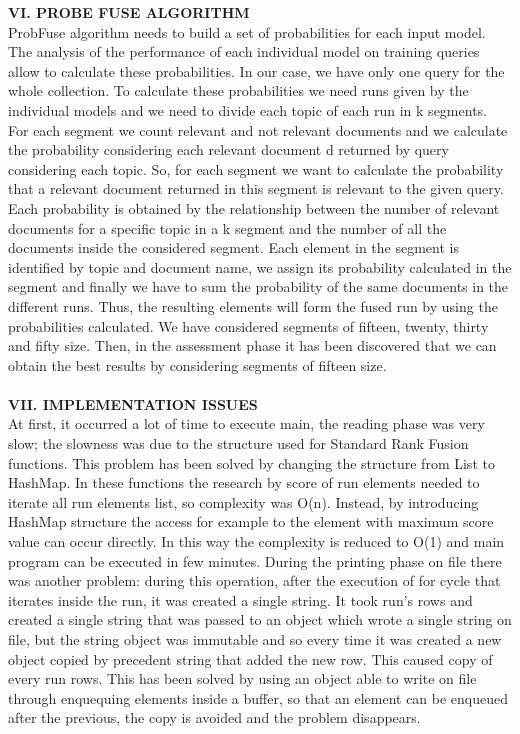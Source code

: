 \documentclass[12pt,journal]{IEEEtran}
\begin{document}
\textbf{VI.	PROBE FUSE ALGORITHM} \\
ProbFuse algorithm needs to build a set of probabilities for each input model. 
The analysis of the performance of each individual model on training queries allow to calculate these probabilities. 
In our case, we have only one query for the whole collection.
To calculate these probabilities we need runs given by the individual models and we need to divide each topic of each run in k segments. For each segment we count relevant and not relevant documents and we calculate the probability considering each relevant document d returned by query considering each topic. 
So, for each segment we want to calculate the probability that a relevant document returned in this segment is relevant to the given query. Each probability is obtained by the relationship between the number of relevant documents for a specific topic in a k segment and the number of all the documents inside the considered segment.
Each element in the segment is identified by topic and document name, we assign its probability calculated in the segment and finally we have to sum the probability of the same documents in the different runs.
Thus, the resulting elements will form the fused run by using the probabilities calculated. 
We have considered segments of fifteen, twenty, thirty and fifty size. Then, in the assessment phase it has been discovered that we can obtain the best results by considering segments of fifteen size. \\ \\
\textbf{VII. IMPLEMENTATION ISSUES} \\
At first, it occurred a lot of time to execute main, the reading phase was very slow; the slowness was due to the structure used for Standard Rank Fusion functions. This problem has been solved by changing the structure from List to HashMap. 
In these functions the research by score of run elements needed to iterate all run elements list, so complexity was O(n). Instead, by introducing HashMap structure the access for example to the element with maximum score value can occur directly. In this way the complexity is reduced to O(1) and main program can be executed in few minutes. 
During the printing phase on file there was another problem: during this operation, after the execution of for cycle that iterates inside the run, it was created a single string. It took run’s rows and created a single string that was passed to an object which wrote a single string on file, but the string object was immutable and so every time it was created a new object copied by precedent string that added the new row. This caused copy of every run rows. This has been solved by using an object able to write on file through enquequing elements inside a buffer, so that an element can be enqueued after the previous, the copy is avoided and the problem disappears. \\
\end{document}
